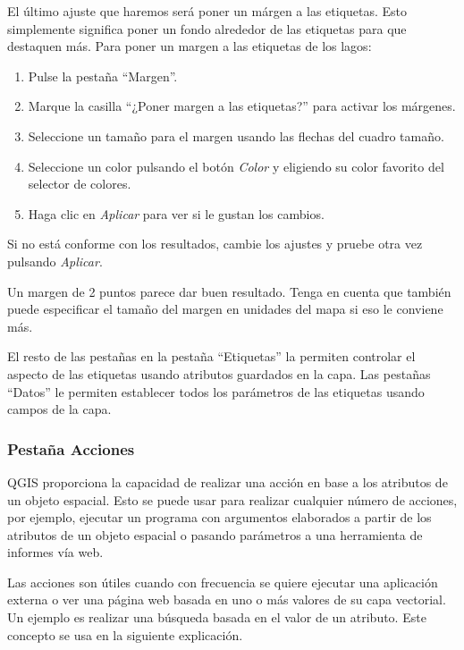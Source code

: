 El último ajuste que haremos será poner un márgen a las etiquetas. Esto simplemente significa poner un fondo alrededor de las etiquetas para que destaquen más. Para poner un margen a las etiquetas de los lagos:

\begin{enumerate}
\item Pulse la pestaña ``Margen''.
\item Marque la casilla ``¿Poner margen a las etiquetas?'' para activar los márgenes.
\item Seleccione un tamaño para el margen usando las flechas del cuadro tamaño.
\item Seleccione un color pulsando el botón \textsl{Color} y eligiendo su color favorito del selector de colores.
\item Haga clic en \textsl{Aplicar} para ver si le gustan los cambios.
\end{enumerate} 

Si no está conforme con los resultados, cambie los ajustes y pruebe otra vez pulsando \textsl{Aplicar}.

Un margen de 2 puntos parece dar buen resultado. Tenga en cuenta que también puede especificar el tamaño del margen en unidades del mapa si eso le conviene más.

El resto de las pestañas en la pestaña ``Etiquetas'' la permiten controlar el aspecto de las etiquetas usando atributos guardados en la capa. Las pestañas ``Datos'' le permiten establecer todos los parámetros de las etiquetas usando campos de la capa.

\subsubsection{Pestaña Acciones}\label{label_actions}

QGIS proporciona la capacidad de realizar una acción en base a los atributos de un objeto espacial. Esto se puede usar para realizar cualquier número de acciones, por ejemplo, ejecutar un programa con argumentos elaborados a partir de los atributos de un objeto espacial o pasando parámetros a una herramienta de informes vía web.

Las acciones son útiles cuando con frecuencia se quiere ejecutar una aplicación externa o ver una página web basada en uno o más valores de su capa vectorial. Un ejemplo es realizar una búsqueda basada en el valor de un atributo. Este concepto se usa en la siguiente explicación.


